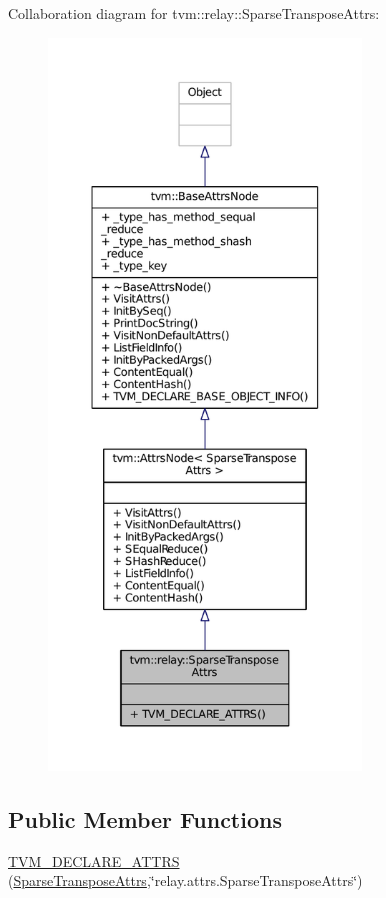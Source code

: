 Collaboration diagram for tvm\+:\+:relay\+:\+:Sparse\+Transpose\+Attrs\+:
\nopagebreak
\begin{figure}[H]
\begin{center}
\leavevmode
\includegraphics[height=550pt]{structtvm_1_1relay_1_1SparseTransposeAttrs__coll__graph}
\end{center}
\end{figure}
\subsection*{Public Member Functions}
\begin{DoxyCompactItemize}
\item 
\hyperlink{structtvm_1_1relay_1_1SparseTransposeAttrs_a0eae1cf2e726950164c73a33dd1ebd53}{T\+V\+M\+\_\+\+D\+E\+C\+L\+A\+R\+E\+\_\+\+A\+T\+T\+RS} (\hyperlink{structtvm_1_1relay_1_1SparseTransposeAttrs}{Sparse\+Transpose\+Attrs},\char`\"{}relay.\+attrs.\+Sparse\+Transpose\+Attrs\char`\"{})
\end{DoxyCompactItemize}
